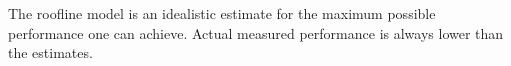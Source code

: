 \documentclass{report}
\begin{document}
The roofline model is an idealistic estimate for the maximum possible performance one can achieve. Actual measured performance is always lower than the estimates. 









\end{document}
